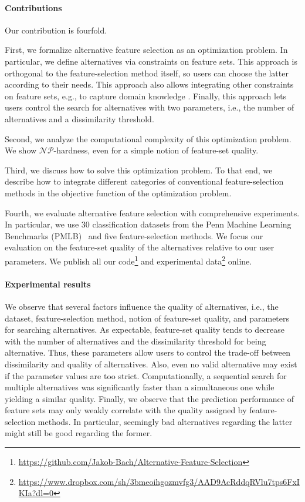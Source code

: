 \documentclass{article}
\theoremstyle{definition}
\begin{document}
\paragraph{Contributions}

Our contribution is fourfold.

First, we formalize alternative feature selection as an optimization problem.
In particular, we define alternatives via constraints on feature sets.
This approach is orthogonal to the feature-selection method itself, so users can choose the latter according to their needs.
This approach also allows integrating other constraints on feature sets, e.g., to capture domain knowledge \cite{bach2022empirical, groves2015toward}.
Finally, this approach lets users control the search for alternatives with two parameters, i.e., the number of alternatives and a dissimilarity threshold.

Second, we analyze the computational complexity of this optimization problem.
We show $\mathcal{NP}$-hardness, even for a simple notion of feature-set quality.

Third, we discuss how to solve this optimization problem.
To that end, we describe how to integrate different categories of conventional feature-selection methods in the objective function of the optimization problem.

Fourth, we evaluate alternative feature selection with comprehensive experiments.
In particular, we use 30 classification datasets from the Penn Machine Learning Benchmarks (PMLB)~\cite{olson2017pmlb, romano2021pmlb} and five feature-selection methods.
We focus our evaluation on the feature-set quality of the alternatives relative to our user parameters.
We publish all our code\footnote{\url{https://github.com/Jakob-Bach/Alternative-Feature-Selection}} and experimental data\footnote{\url{https://www.dropbox.com/sh/3bmeoihgozmvfg3/AAD9AcRddqRVlu7tps6FxIKIa?dl=0}} online. %

\paragraph{Experimental results}

We observe that several factors influence the quality of alternatives, i.e., the dataset, feature-selection method, notion of feature-set quality, and parameters for searching alternatives.
As expectable, feature-set quality tends to decrease with the number of alternatives and the dissimilarity threshold for being alternative.
Thus, these parameters allow users to control the trade-off between dissimilarity and quality of alternatives.
Also, even no valid alternative may exist if the parameter values are too strict.
Computationally, a sequential search for multiple alternatives was significantly faster than a simultaneous one while yielding a similar quality.
Finally, we observe that the prediction performance of feature sets may only weakly correlate with the quality assigned by feature-selection methods.
In particular, seemingly bad alternatives regarding the latter might still be good regarding the former.
\end{document}
